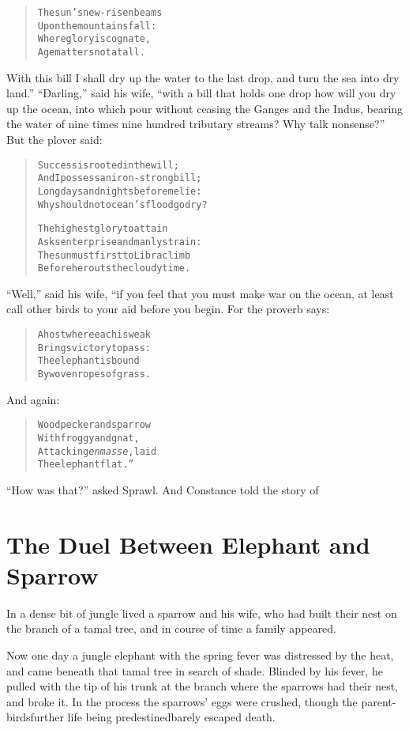 \documentclass[article, twoside, 14pt]{memoir}
\renewenvironment{verbatim}{%
\begin{quote}%
\vskip -10pt%
\begin{alltt}\normalfont\large}{\end{alltt}%
\end{quote}%
\vskip -10pt
} %
\begin{document}
\begin{verbatim}
The sun's new-risen beams
Upon the mountains fall:
Where glory is cognate,
Age matters not at all.
\end{verbatim}
With this bill I shall dry up the water to the last drop, and turn
the sea into dry land.” ``Darling,'' said his wife,
``with a bill that holds one drop how will you dry up the ocean, into which pour without ceasing the Ganges and the Indus, bearing the water of nine times nine hundred tributary streams? Why talk nonsense?''
But the plover said:

\begin{verbatim}
Success is rooted in the will;
And I possess an iron-strong bill;
Long days and nights before me lie:
Why should not ocean's flood go dry?

The highest glory to attain
Asks enterprise and manly strain:
The sun must first to Libra climb
Before he routs the cloudy time.
\end{verbatim}
``Well,'' said his wife, “if you feel that you must make war on the
ocean, at least call other birds to your aid before you begin. For
the proverb says:

\begin{verbatim}
A host where each is weak
    Brings victory to pass:
The elephant is bound
    By woven ropes of grass.
\end{verbatim}
And again:

\begin{verbatim}
Woodpecker and sparrow
    With froggy and gnat,
Attacking \emph{en masse}, laid
    The elephant flat.”
\end{verbatim}
``How was that?'' asked Sprawl. And Constance told the story of

\chapter{The Duel Between Elephant and Sparrow}

\label{s21}

In a dense bit of jungle lived a sparrow and his wife, who had
built their nest on the branch of a tamal tree, and in course of
time a family appeared.

Now one day a jungle elephant with the spring fever was distressed
by the heat, and came beneath that tamal tree in search of shade.
Blinded by his fever, he pulled with the tip of his trunk at the
branch where the sparrows had their nest, and broke it. In
the process the sparrows' eggs were crushed, though the
parent-birds{\textemdash}further life being predestined{\textemdash}barely escaped
death.
\end{document}
